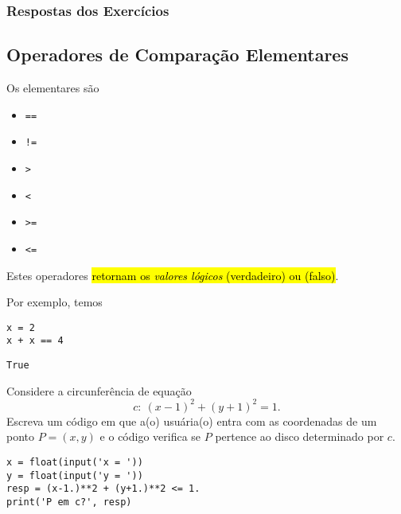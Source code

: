 \ifisbook 
\subsubsection*{Respostas dos Exercícios}
\shipoutAnswer
\fi

\subsection{Operadores de Comparação Elementares}

Os  elementares são
\begin{itemize}
\item[]\texttt{==} 
\item[]\texttt{!=} 
\item[]\texttt{>} 
\item[]\texttt{<} 
\item[]\texttt{>=} 
\item[]\texttt{<=} 
\end{itemize}
Estes operadores \hl{retornam os \emph{valores lógicos} {\PYTHONTrue} (verdadeiro) ou {\PYTHONFalse} (falso)}.

Por exemplo, temos

\begin{lstlisting}
x = 2
x + x == 4
\end{lstlisting}

\begin{verbatim}
True
\end{verbatim}

\begin{exer}
  Considere a circunferência de equação
  \begin{equation}
    c: ~(x - 1)^2 + (y + 1)^2 = 1.
  \end{equation}
  Escreva um código em que a(o) usuária(o) entra com as coordenadas de um ponto $P = (x, y)$ e o código verifica se $P$ pertence ao disco determinado por $c$.
\end{exer}
\begin{resp}
  
\begin{lstlisting}
x = float(input('x = '))
y = float(input('y = '))
resp = (x-1.)**2 + (y+1.)**2 <= 1.
print('P em c?', resp)
\end{lstlisting}

\end{resp}

